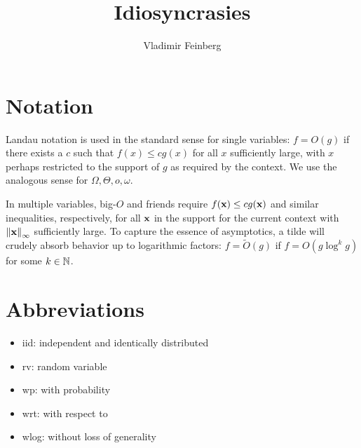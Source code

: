 \documentclass{article}
\title{Idiosyncrasies}
\author{Vladimir Feinberg}
\begin{document}
\maketitle

\section{Notation}

Landau notation is used in the standard sense for single variables: $f=O(g)$ if there exists a $c$ such that $f(x)\le cg(x)$ for all $x$ sufficiently large, with $x$ perhaps restricted to the support of $g$ as required by the context. We use the analogous sense for $\Omega,\Theta,o,\omega$.

In multiple variables, big-$O$ and friends require $f(\textbf{x})\le cg(\textbf{x})$ and similar inequalities, respectively, for all $\textbf{x}$ in the support for the current context with $\left\| \textbf{x} \right\|_\infty$ sufficiently large. To capture the essence of asymptotics, a tilde will crudely absorb behavior up to logarithmic factors: $f=\tilde{O}(g)$ if $f=O(g\log^k g)$ for some $k\in\mathbb{N}$.

\section{Abbreviations}

\begin{itemize}
\item iid: independent and identically distributed
\item rv: random variable
\item wp: with probability
\item wrt: with respect to
\item wlog: without loss of generality
  \end{itemize}
\end{document}
